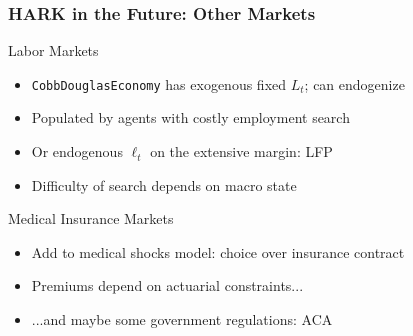 \documentclass[11pt]{cfpbpresentation}
\begin{document}
\begin{frame}
\frametitle{HARK in the Future: Other Markets}

\begin{block}{Labor Markets}
\begin{itemize}
\item \texttt{CobbDouglasEconomy} has exogenous fixed $L_t$; can endogenize

\item Populated by agents with costly employment search

\item Or endogenous $\ell_t$ on the extensive margin: LFP

\item Difficulty of search depends on macro state
\end{itemize}
\end{block}

\begin{block}{Medical Insurance Markets}
\begin{itemize}
\item Add to medical shocks model: choice over insurance contract

\item Premiums depend on actuarial constraints...

\item ...and maybe some government regulations: ACA
\end{itemize}
\end{block}

\end{frame}
\end{document}
